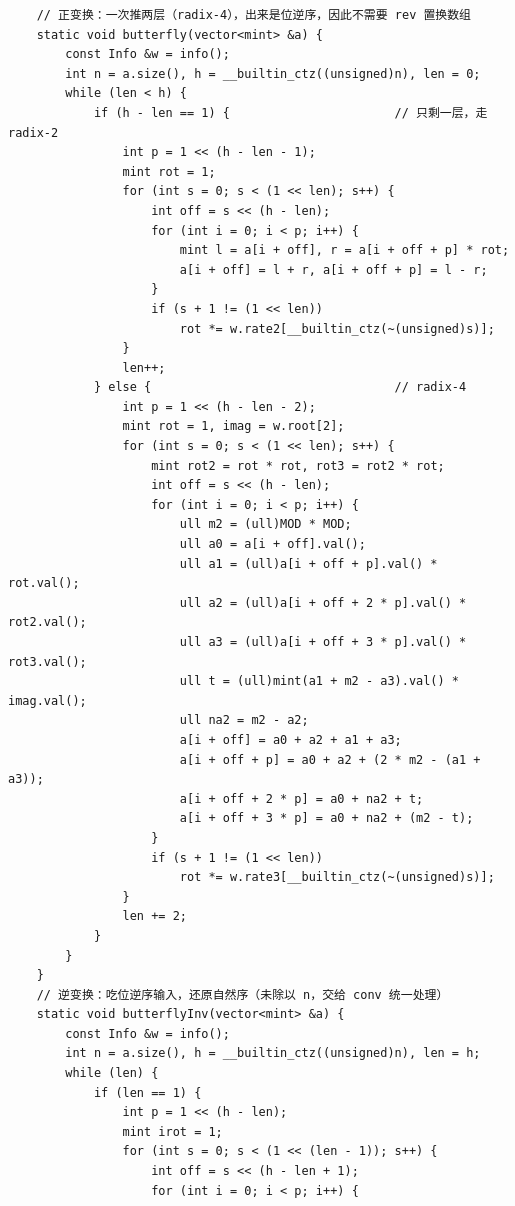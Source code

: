 \begin{verbatim}
    // 正变换：一次推两层（radix-4），出来是位逆序，因此不需要 rev 置换数组
    static void butterfly(vector<mint> &a) {
        const Info &w = info();
        int n = a.size(), h = __builtin_ctz((unsigned)n), len = 0;
        while (len < h) {
            if (h - len == 1) {                       // 只剩一层，走 radix-2
                int p = 1 << (h - len - 1);
                mint rot = 1;
                for (int s = 0; s < (1 << len); s++) {
                    int off = s << (h - len);
                    for (int i = 0; i < p; i++) {
                        mint l = a[i + off], r = a[i + off + p] * rot;
                        a[i + off] = l + r, a[i + off + p] = l - r;
                    }
                    if (s + 1 != (1 << len))
                        rot *= w.rate2[__builtin_ctz(~(unsigned)s)];
                }
                len++;
            } else {                                  // radix-4
                int p = 1 << (h - len - 2);
                mint rot = 1, imag = w.root[2];
                for (int s = 0; s < (1 << len); s++) {
                    mint rot2 = rot * rot, rot3 = rot2 * rot;
                    int off = s << (h - len);
                    for (int i = 0; i < p; i++) {
                        ull m2 = (ull)MOD * MOD;
                        ull a0 = a[i + off].val();
                        ull a1 = (ull)a[i + off + p].val() * rot.val();
                        ull a2 = (ull)a[i + off + 2 * p].val() * rot2.val();
                        ull a3 = (ull)a[i + off + 3 * p].val() * rot3.val();
                        ull t = (ull)mint(a1 + m2 - a3).val() * imag.val();
                        ull na2 = m2 - a2;
                        a[i + off] = a0 + a2 + a1 + a3;
                        a[i + off + p] = a0 + a2 + (2 * m2 - (a1 + a3));
                        a[i + off + 2 * p] = a0 + na2 + t;
                        a[i + off + 3 * p] = a0 + na2 + (m2 - t);
                    }
                    if (s + 1 != (1 << len))
                        rot *= w.rate3[__builtin_ctz(~(unsigned)s)];
                }
                len += 2;
            }
        }
    }
    // 逆变换：吃位逆序输入，还原自然序（未除以 n，交给 conv 统一处理）
    static void butterflyInv(vector<mint> &a) {
        const Info &w = info();
        int n = a.size(), h = __builtin_ctz((unsigned)n), len = h;
        while (len) {
            if (len == 1) {
                int p = 1 << (h - len);
                mint irot = 1;
                for (int s = 0; s < (1 << (len - 1)); s++) {
                    int off = s << (h - len + 1);
                    for (int i = 0; i < p; i++) {

\end{verbatim}
